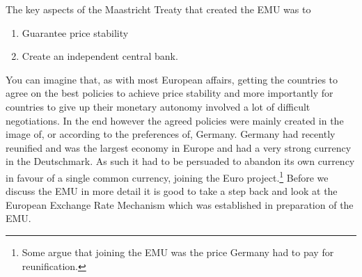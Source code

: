 \documentclass{tufte-handout}
\begin{document}
The key aspects of the Maastricht Treaty that created the EMU was to 
\begin{enumerate}
  \item Guarantee price stability 
  \item Create an independent central bank. 
\end{enumerate}
You can imagine that, as with most European affairs, getting the countries to agree on the best policies to achieve price stability and more importantly for countries to give up their monetary autonomy involved a lot of difficult negotiations. 
In the end however the agreed policies were mainly created in the image of, or according to the preferences of, Germany. 
Germany had recently reunified and was the largest economy in Europe and had a very strong currency in the Deutschmark. 
As such it had to be persuaded to abandon its own currency in favour of a single common currency, joining the Euro project.\footnote{Some argue that joining the EMU was the price Germany had to pay for reunification.}
Before we discuss the EMU in more detail it is good to take a step back and look at the European Exchange Rate Mechanism which was established in preparation of the EMU.

\end{document}
